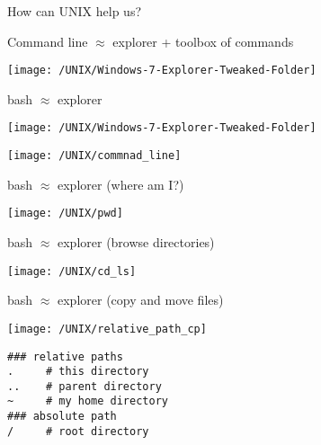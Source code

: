 \documentclass[xcolor=dvipsnames]{beamer}
\begin{document}
\begin{frame}
	\Huge
	\begin{center}
		How can UNIX help us?	
	\end{center}
\end{frame}

\begin{frame}
	Command line $\approx$ explorer + toolbox of commands
	\begin{center}
		\texttt{[image: /UNIX/Windows-7-Explorer-Tweaked-Folder]}
	\end{center}
\end{frame}

\begin{frame}
	bash $\approx$ explorer
	\begin{center}
		\texttt{[image: /UNIX/Windows-7-Explorer-Tweaked-Folder]}
	\end{center}
\end{frame}

\begin{frame}
	\begin{center}
		\texttt{[image: /UNIX/commnad\_line]}
	\end{center}
\end{frame}

\begin{frame}
	bash $\approx$ explorer (where am I?)
	\begin{center}
		\texttt{[image: /UNIX/pwd]}
	\end{center}
\end{frame}

\begin{frame}
	bash $\approx$ explorer (browse directories)
	\begin{center}
		\texttt{[image: /UNIX/cd\_ls]}
	\end{center}
\end{frame}

\begin{frame}
	bash $\approx$ explorer (copy and move files)
	\begin{center}
		\texttt{[image: /UNIX/relative\_path\_cp]}
	\end{center}
\end{frame}

\begin{frame}[fragile]
\begin{verbatim}
### relative paths
.     # this directory
..    # parent directory
~     # my home directory
### absolute path
/     # root directory
\end{verbatim}
\end{frame}
\end{document}
